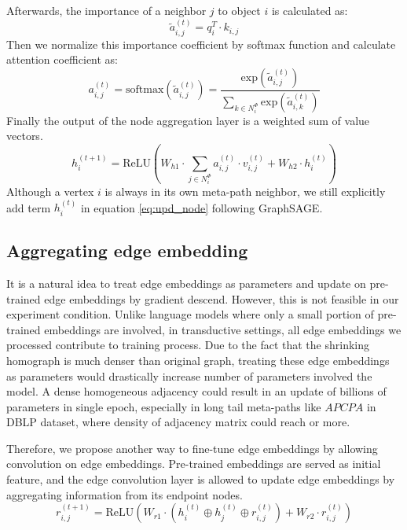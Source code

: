 \noindent Afterwards, the importance of a neighbor $j$ to object $i$ is calculated as:
\begin{equation}
\label{eq:dot}
\tilde{a}^{(t)}_{i,j} = q_i^T \cdot k_{i,j}
\end{equation}
Then we normalize this importance coefficient by softmax function and calculate attention coefficient as:
\begin{equation}
\label{eq:softmax}
a^{(t)}_{i,j} = \text{softmax}(\tilde{a}^{(t)}_{i,j}) = \dfrac{\text{exp}(\tilde{a}^{(t)}_{i,j})}{\sum_{k\in N^\Phi_i}\text{exp}(\tilde{a}^{(t)}_{i,k})}
\end{equation}
Finally the output of the node aggregation layer is a weighted sum of value vectors. 
\begin{equation}
\label{eq:upd_node}
h^{(t+1)}_i = \text{ReLU}( W_{h1}\cdot \sum_{j\in N^\Phi_i} a^{(t)}_{i,j} \cdot v^{(t)}_{i,j} + W_{h2}\cdot h^{(t)}_i) 
\end{equation} 
Although a vertex $i$ is always in its own meta-path neighbor, we still explicitly add term $h^{(t)}_i$ in equation \ref{eq:upd_node} following GraphSAGE\cite{HamiltonYL17}.

\subsection{Aggregating edge embedding}
It is a natural idea to treat edge embeddings as parameters and update on pre-trained edge embeddings by gradient descend. However, this is not feasible in our experiment condition. Unlike language models where only a small portion of pre-trained embeddings are involved, in transductive settings, all edge embeddings we processed contribute to training process. 
Due to the fact that the shrinking homograph is much denser than original graph, treating these edge embeddings as parameters would drastically increase number of parameters involved the model. A dense homogeneous adjacency could result in an update of billions of parameters in single epoch, especially in long tail meta-paths like $APCPA$ in DBLP dataset, where density of adjacency matrix could reach  or more.

Therefore, we propose another way to fine-tune edge embeddings by allowing convolution on edge embeddings. Pre-trained embeddings are served as initial feature, and the edge convolution layer is allowed to update edge embeddings by aggregating information from its endpoint nodes. 
\begin{equation}
\label{eq:upd_edge}
r^{(t+1)}_{i,j} = \text{ReLU}(W_{r1}\cdot (h^{(t)}_i \oplus h^{(t)}_j \oplus r^{(t)}_{i,j}) + W_{r2}\cdot r^{(t)}_{i,j}) 
\end{equation} 


